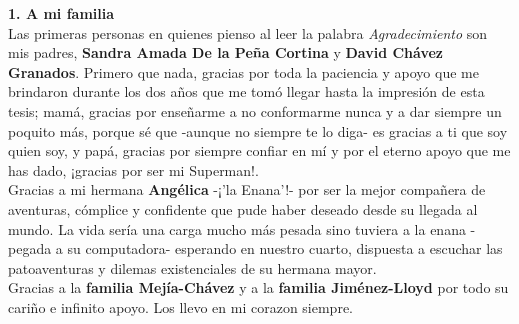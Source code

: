 \documentclass[
12pt, %
spanish, %
singlespacing, %
headsepline, %
]{MastersDoctoralThesis} %
\begin{document}

\begin{acknowledgements}
\addchaptertocentry{\acknowledgementname} %

\textbf{1. A mi familia}\\

Las primeras personas en quienes pienso al leer la palabra \textit{Agradecimiento} son mis padres, \textbf{Sandra Amada De la Peña Cortina} y \textbf{David Chávez Granados}. Primero que nada, gracias por toda la paciencia y apoyo que me brindaron durante los dos años que me tomó llegar hasta la impresión de esta tesis; mamá, gracias por enseñarme a no conformarme nunca y a dar siempre un poquito más, porque sé que -aunque no siempre te lo diga- es gracias a ti que soy quien soy, y papá, gracias por siempre confiar en mí y por el eterno apoyo que me has dado, ¡gracias por ser mi Superman!. \\

Gracias a mi hermana \textbf{Angélica} -¡'la Enana'!- por ser la mejor compañera de aventuras, cómplice y confidente que pude haber deseado desde su llegada al mundo. La vida sería una carga mucho más pesada sino tuviera a la enana -pegada a su computadora- esperando en nuestro cuarto, dispuesta a escuchar las patoaventuras y dilemas existenciales de su hermana mayor.\\


Gracias a la \textbf{familia Mejía-Chávez} y a la \textbf{familia Jiménez-Lloyd} por todo su cariño e infinito apoyo. Los llevo en mi corazon siempre.\\



\end{acknowledgements}
\end{document}
